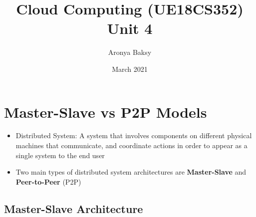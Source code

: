 \documentclass{article}
\title{Cloud Computing (UE18CS352) \\Unit 4}
\author{Aronya Baksy}
\date{March 2021}
\begin{document}
\maketitle
\section{Master-Slave vs P2P Models}
\begin{itemize}
    \item Distributed System: A system that involves components on different physical machines that communicate, and coordinate actions in order to appear as a single system to the end user
    
    \item Two main types of distributed system architectures are \textbf{Master-Slave} and \textbf{Peer-to-Peer} (P2P)

\end{itemize}

\subsection{Master-Slave Architecture}
\end{document}
